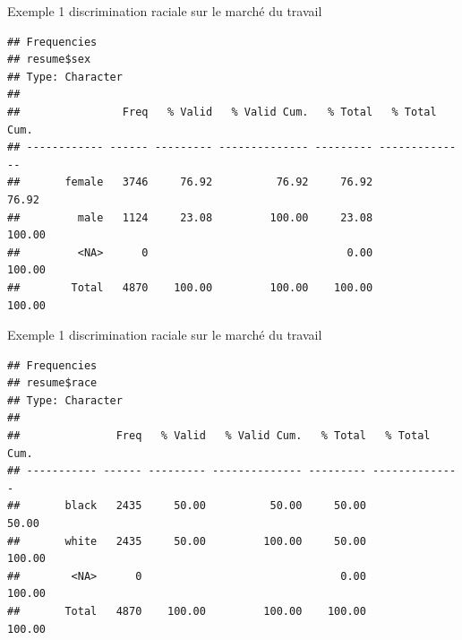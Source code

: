 \documentclass[ignorenonframetext,]{beamer}
\newenvironment{Shaded}{\begin{snugshade}}{\end{snugshade}}
\newcommand{\KeywordTok}[1]{\textcolor[rgb]{0.13,0.29,0.53}{\textbf{#1}}}
\newcommand{\NormalTok}[1]{#1}
\newcommand{\OperatorTok}[1]{\textcolor[rgb]{0.81,0.36,0.00}{\textbf{#1}}}
\begin{document}
\begin{frame}[fragile]{Exemple 1 discrimination raciale sur le marché du
travail}
\protect\hypertarget{exemple-1-discrimination-raciale-sur-le-marche-du-travail-6}{}

\begin{Shaded}
\end{Shaded}

\begin{verbatim}
## Frequencies  
## resume$sex  
## Type: Character  
## 
##                Freq   % Valid   % Valid Cum.   % Total   % Total Cum.
## ------------ ------ --------- -------------- --------- --------------
##       female   3746     76.92          76.92     76.92          76.92
##         male   1124     23.08         100.00     23.08         100.00
##         <NA>      0                               0.00         100.00
##        Total   4870    100.00         100.00    100.00         100.00
\end{verbatim}

\end{frame}

\begin{frame}[fragile]{Exemple 1 discrimination raciale sur le marché du
travail}
\protect\hypertarget{exemple-1-discrimination-raciale-sur-le-marche-du-travail-7}{}

\begin{Shaded}
\end{Shaded}

\begin{verbatim}
## Frequencies  
## resume$race  
## Type: Character  
## 
##               Freq   % Valid   % Valid Cum.   % Total   % Total Cum.
## ----------- ------ --------- -------------- --------- --------------
##       black   2435     50.00          50.00     50.00          50.00
##       white   2435     50.00         100.00     50.00         100.00
##        <NA>      0                               0.00         100.00
##       Total   4870    100.00         100.00    100.00         100.00
\end{verbatim}

\end{frame}
\end{document}
